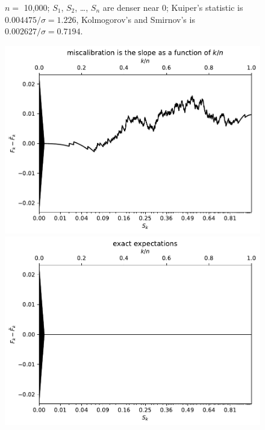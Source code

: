 \documentclass{article}
\begin{document}
\begin{figure}
\begin{centering}
\end{centering}
\caption{$n =$ 10,000; $S_1$, $S_2$, \dots, $S_n$ are denser near 0;
         Kuiper's statistic is $0.004475 / \sigma = 1.226$,
         Kolmogorov's and Smirnov's is $0.002627 / \sigma = 0.7194$.}
\label{10000_00}
\end{figure}


\begin{figure}
\begin{centering}

\parbox{\imsize}{\includegraphics[width=\imsize]
                {./codes/unweighted/1000_10_1_3/cumulative.pdf}}
\quad\quad
\parbox{\imsize}{\includegraphics[width=\imsize]
                {./codes/unweighted/1000_10_1_3/cumulative_exact.pdf}}


\end{centering}
\end{figure}
\end{document}
